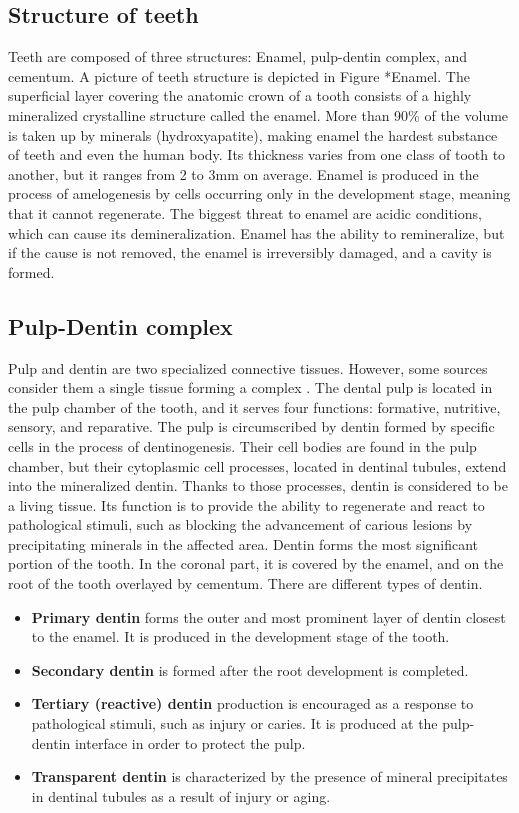 \subsection{Structure of teeth}
Teeth are composed of three structures: Enamel, pulp-dentin complex, and cementum. A picture of teeth structure is depicted in Figure *{Enamel}.
The superficial layer covering the anatomic crown of a tooth consists of a highly mineralized crystalline structure called the enamel. More than 90\% of the volume is taken up by minerals (hydroxyapatite), making enamel the hardest substance of teeth and even the human body. Its thickness varies from one class of tooth to another, but it ranges from 2 to 3mm on average. Enamel is produced in the process of amelogenesis by cells occurring only in the development stage, meaning that it cannot regenerate. The biggest threat to enamel are acidic conditions, which can cause its demineralization. Enamel has the ability to remineralize, but if the cause is not removed, the enamel is irreversibly damaged, and a cavity is formed.

\subsection*{Pulp-Dentin complex}
Pulp and dentin are two specialized connective tissues. However, some sources consider them a single tissue forming a complex \cite{2019a}.
The dental pulp is located in the pulp chamber of the tooth, and it serves four functions: formative, nutritive, sensory, and reparative.
The pulp is circumscribed by dentin formed by specific cells in the process of dentinogenesis. Their cell bodies are found in the pulp chamber, but their cytoplasmic cell processes, located in dentinal tubules, extend into the mineralized dentin. Thanks to those processes, dentin is considered to be a living tissue. Its function is to provide the ability to regenerate and react to pathological stimuli, such as blocking the advancement of carious lesions by precipitating minerals in the affected area.
Dentin forms the most significant portion of the tooth. In the coronal part, it is covered by the enamel, and on the root of the tooth overlayed by cementum. There are different types of dentin.
\begin{itemize}
    \item \textbf{Primary dentin} forms the outer and most prominent layer of dentin closest to the enamel. It is produced in the development stage of the tooth.
    \item \textbf {Secondary dentin} is formed after the root development is completed.
    \item \textbf{Tertiary (reactive) dentin} production is encouraged as a response to pathological stimuli, such as injury or caries. It is produced at the pulp-dentin interface in order to protect the pulp.
    \item \textbf{Transparent dentin} is characterized by the presence of mineral precipitates in dentinal tubules as a result of injury or aging.
\end{itemize}


